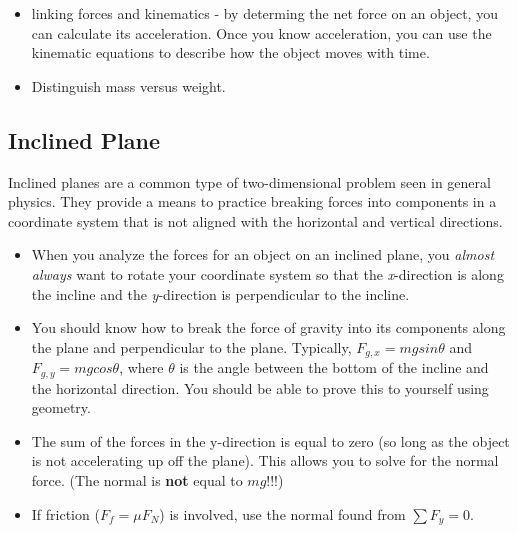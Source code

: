 \begin{itemize}
\item linking forces and kinematics - by determing the net force on an
  object, you can calculate its acceleration.  Once you know
  acceleration, you can use the kinematic equations to describe how
  the object moves with time.
\item Distinguish mass versus weight.
\end{itemize}


\subsection{Inclined Plane}
Inclined planes are a common type of two-dimensional problem seen
in general physics.  They
provide a means to practice breaking forces into components in a
coordinate system that is not aligned with the horizontal and vertical
directions.

\begin{itemize}
\item When you analyze the forces for an object on an inclined plane, you
{\it almost always} want to rotate your coordinate system so that the
{\em x}-direction is along the incline and the {\em y}-direction is
perpendicular to the incline.
\item You should know how to break the force of gravity into its components along
  the plane and perpendicular to the plane.  Typically, $F_{g,x} = m g
  sin \theta$ and $F_{g,y} = m g cos \theta$, where $\theta$ is the
  angle between the bottom of the incline and the horizontal
  direction.  You should be able to
  prove this to yourself using geometry.
\item The sum of the forces in the y-direction is equal to zero (so
  long as the object is not accelerating up off the plane).  This
  allows you to solve for the normal force.  (The normal is {\bf not} equal
  to $mg$!!!)
\item If friction ($F_f = \mu F_N$) is involved, use the normal found
  from $\sum F_y = 0$. 
\end{itemize}




\vspace*{-.15in}

